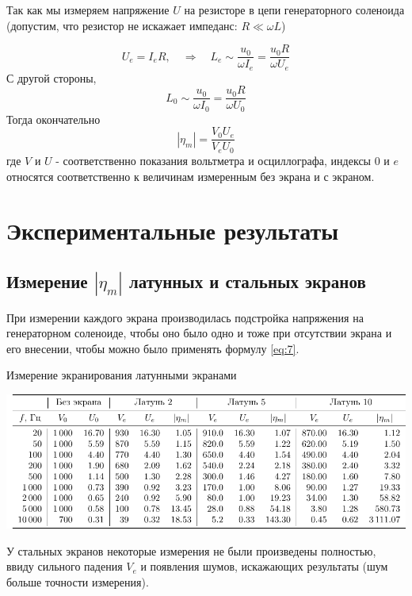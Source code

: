 Так как мы измеряем напряжение $U$ на резисторе в цепи генераторного соленоида (допустим, что резистор не искажает импеданс: $R\ll \omega L$)

\begin{equation}
	U_e=I_eR, \quad\Rightarrow\quad L_e\sim \frac{u_0}{\omega I_e}=\frac{u_0 R}{\omega U_e}
\end{equation}
С другой стороны, 
\begin{equation}
	L_0\sim \frac{u_0}{\omega I_0} = \frac{u_0 R}{\omega U_0}
\end{equation}
Тогда окончательно
\begin{equation}
	|\eta_m|=\frac{V_0U_e}{V_eU_0}
\label{eq:7}
\end{equation}
где $V$ и $U$ - соответственно показания вольтметра и осциллографа, индексы $0$ и $e$ относятся соответственно к величинам измеренным без экрана и с экраном.


\newpage
\section{Экспериментальные результаты}
\subsection{Измерение $|\eta_m|$ латунных и стальных экранов}

При измерении каждого экрана производилась подстройка напряжения на генераторном соленоиде, чтобы оно было одно и тоже при отсутствии экрана и его внесении, чтобы можно было применять формулу \eqref{eq:7}.

\begin{table}[h!]
	\caption{Измерение экранирования латунными экранами}
	\label{tab:6s1}
	\vspace{1em}
	\centering
	\includegraphics[width=\textwidth]{tables/table1}
\end{table}

У стальных экранов некоторые измерения не были произведены полностью, ввиду сильного падения $V_e$ и появления шумов, искажающих результаты (шум больше точности измерения).

